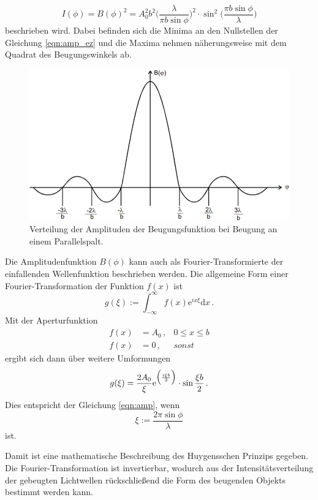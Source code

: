 \begin{equation}
    I(\phi) = B(\phi)^2 = A_0^2 b^2 \Biggl(\frac{\lambda}{\pi b \sin\phi}\Biggr)^2 \cdot \sin^2\Biggl(\frac{\pi b\sin\phi}{\lambda}\Biggr)
\end{equation}
beschrieben wird. Dabei befinden sich die Minima an den Nullstellen der Gleichung \ref{eqn:amp_ez} und die Maxima nehmen näherungsweise 
mit dem Quadrat des Beugungswinkels ab. 
\begin{figure}
    \centering
    \includegraphics[width=\textwidth]{data/amp_verteilung.png}
    \caption{Verteilung der Amplituden der Beugungsfunktion bei Beugung an einem Parallelspalt.}
    \label{fig:int_vert}
\end{figure}

Die Amplitudenfunktion $B(\phi)$ kann auch als Fourier-Transformierte der einfallenden Wellenfunktion beschrieben werden. 
Die allgemeine Form einer Fourier-Transformation der Funktion $f(x) $ ist 
\begin{equation}
    g(\xi) := \int_{-\infty}^\infty f(x)\mathrm{e}^{i x \xi} \mathrm{d}x\,.
\end{equation}
Mit der Aperturfunktion 
\begin{align}
    f(x) &= A_0\,,& 0\leq x\leq b\\
    f(x) &= 0\,,& sonst 
\end{align}
ergibt sich dann über weitere Umformungen
\begin{equation}
    g(\xi) = \frac{2A_0}{\xi} \mathrm{e}^{\Bigl(\frac{i\xi b}{2}\Bigr)}\cdot\sin\frac{\xi b}{2}\,.
\end{equation}
Dies entspricht der Gleichung \ref{eqn:amp}, wenn 
\begin{equation}
    \xi := \frac{2\pi\sin\phi}{\lambda}
\end{equation}
ist.

Damit ist eine mathematische Beschreibung des Huygensschen Prinzips gegeben. Die Fourier-Transformation ist invertierbar, wodurch aus der 
Intensitätsverteilung der gebeugten Lichtwellen rückschließend die Form des beugenden Objekts bestimmt werden kann. 